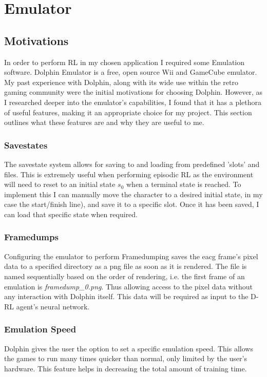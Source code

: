 
\chapter{Emulator}
\section{Motivations}
In order to perform RL in my chosen application I required some Emulation software. Dolphin Emulator \cite{DolphinEmulator} is a free, open source Wii and GameCube emulator. My past experience with Dolphin, along with its wide use within the retro gaming community were the initial motivations for choosing Dolphin. However, as I researched deeper into the emulator's capabilities, I found that it has a plethora of useful features, making it an appropriate choice for my project. This section outlines what these features are and why they are useful to me.
\subsection{Savestates}
The savestate system allows for saving to and loading from predefined 'slots' and files. This is extremely useful when performing episodic RL as the environment will need to reset to an initial state $s_0$ when a terminal state is reached. To implement this I can manually move the character to a desired initial state, in my case the start/finish line), and save it to a specific slot. Once it has been saved, I can load that specific state when required. 
\subsection{Framedumps}
Configuring the emulator to perform Framedumping saves the eacg frame's pixel data to a specified directory as a png file as soon as it is rendered. The file is named sequentially based on the order of rendering, i.e. the first frame of an emulation is \textit{framedump\_0.png}. Thus allowing access to the pixel data without any interaction with Dolphin itself. This data will be required as input to the D-RL agent's neural network.
\subsection{Emulation Speed}
Dolphin gives the user the option to set a specific emulation speed. This allows the games to run many times quicker than normal, only limited by the user's hardware. This feature helps in decreasing the total amount of training time.
